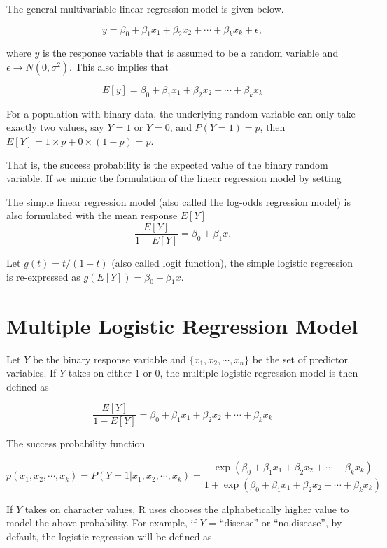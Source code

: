 \documentclass[
]{book}
\begin{document}
The general multivariable linear regression model is given below.

\[
y = \beta_0 + \beta_1x_1 + \beta_2 x_2 + \cdots + \beta_kx_k + \epsilon,
\]

where \(y\) is the response variable that is assumed to be a random variable and \(\epsilon \to N(0, \sigma^2)\). This also implies that

\[
E[y] = \beta_0 + \beta_1x_1 + \beta_2 x_2 + \cdots + \beta_kx_k
\]

For a population with binary data, the underlying random variable can only take exactly two values, say \(Y=1\) or \(Y=0\), and \(P(Y=1) = p\), then \(E[Y] = 1\times p + 0\times (1-p) = p.\)

That is, the success probability is the expected value of the binary random variable. If we mimic the formulation of the linear regression model by setting

The simple linear regression model (also called the log-odds regression model) is also formulated with the mean response \(E[Y]\)
\[
\frac{E[Y]}{1-E[Y]} = \beta_0 + \beta_1x.
\]

Let \(g(t) = t/(1-t)\) (also called logit function), the simple logistic regression is re-expressed as \(g(E[Y]) = \beta_0 + \beta_1x\).

\hypertarget{multiple-logistic-regression-model-1}{%
\section{Multiple Logistic Regression Model}\label{multiple-logistic-regression-model-1}}

Let \(Y\) be the binary response variable and \(\{x_1, x_2, \cdots, x_n \}\) be the set of predictor variables. If \(Y\) takes on either 1 or 0, the multiple logistic regression model is then defined as

\[
\frac{E[Y]}{1-E[Y]} = \beta_0 + \beta_1x_1 + \beta_2 x_2 + \cdots + \beta_kx_k
\]

The success probability function

\[
p(x_1, x_2, \cdots, x_k)=P(Y=1|x_1, x_2, \cdots, x_k) =\frac{\exp(\beta_0 + \beta_1x_1 + \beta_2 x_2 + \cdots + \beta_kx_k)}{1+\exp(\beta_0 + \beta_1x_1 + \beta_2 x_2 + \cdots + \beta_kx_k)}
\]

If \(Y\) takes on character values, R uses chooses the alphabetically higher value to model the above probability. For example, if \(Y\) = ``disease'' or ``no.disease'', by default, the logistic regression will be defined as
\end{document}
